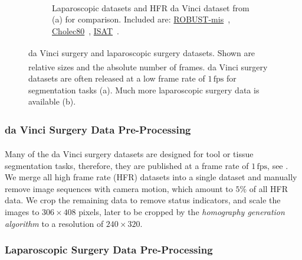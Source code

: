 \begin{figure}[tb]
\begin{subfigure}[b]{0.49\textwidth}
    \caption{Laparoscopic datasets and HFR da Vinci\textsuperscript{\textregistered} dataset from (a) for comparison. Included are: \href{https://robustmis2019.grand-challenge.org/}{ROBUST-\acrshort{mis}}~\cite{maier2020heidelberg}, \href{http://camma.u-strasbg.fr/datasets}{Cholec80}~\cite{twinanda2016endonet}, \href{https://endovissub-instrument.grand-challenge.org/}{ISAT}~\cite{bodenstedt2018comparative}.}
    \label{c3:fig:data_b}
\end{subfigure}    
\caption{da Vinci\textsuperscript{\textregistered} surgery and laparoscopic surgery datasets. Shown are relative sizes and the absolute number of frames. da Vinci\textsuperscript{\textregistered} surgery datasets are often released at a low frame rate of $1\,\text{fps}$ for segmentation tasks (a). Much more laparoscopic surgery data is available (b).}
\label{c3:fig:data}
\end{figure}

\subsubsection{da Vinci\texorpdfstring{\textsuperscript{\textregistered}}{} Surgery Data Pre-Processing}

Many of the da Vinci\textsuperscript{\textregistered} surgery datasets are designed for tool or tissue segmentation tasks, therefore, they are published at a frame rate of $1\,\text{fps}$, see . We merge all high frame rate (HFR) datasets into a single dataset and manually remove image sequences with camera motion, which amount to $5\%$ of all
HFR data. We crop the remaining data to remove status indicators, and scale the images to $306\times408$ pixels, later to be cropped by the \textit{homography generation algorithm} to a resolution of $240\times320$.

\subsubsection{Laparoscopic Surgery Data Pre-Processing}
\label{c3:sec:lap_pre}

